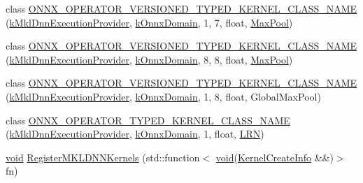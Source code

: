 \begin{DoxyCompactItemize}
\item 
class \mbox{\hyperlink{namespaceonnxruntime_1_1mkl__dnn_a4182bb90f51f577a356ff8ab41650f40}{O\+N\+N\+X\+\_\+\+O\+P\+E\+R\+A\+T\+O\+R\+\_\+\+V\+E\+R\+S\+I\+O\+N\+E\+D\+\_\+\+T\+Y\+P\+E\+D\+\_\+\+K\+E\+R\+N\+E\+L\+\_\+\+C\+L\+A\+S\+S\+\_\+\+N\+A\+ME}} (\mbox{\hyperlink{namespaceonnxruntime_abd1901c951bcb5845eeeaff9dd75ce97}{k\+Mkl\+Dnn\+Execution\+Provider}}, \mbox{\hyperlink{namespaceonnxruntime_ac0e7c0c106a2c9e9594560a3ab289fa0}{k\+Onnx\+Domain}}, 1, 7, float, \mbox{\hyperlink{classonnxruntime_1_1MaxPool}{Max\+Pool}})
\item 
class \mbox{\hyperlink{namespaceonnxruntime_1_1mkl__dnn_a363080a8931f5851f20746639d789b09}{O\+N\+N\+X\+\_\+\+O\+P\+E\+R\+A\+T\+O\+R\+\_\+\+V\+E\+R\+S\+I\+O\+N\+E\+D\+\_\+\+T\+Y\+P\+E\+D\+\_\+\+K\+E\+R\+N\+E\+L\+\_\+\+C\+L\+A\+S\+S\+\_\+\+N\+A\+ME}} (\mbox{\hyperlink{namespaceonnxruntime_abd1901c951bcb5845eeeaff9dd75ce97}{k\+Mkl\+Dnn\+Execution\+Provider}}, \mbox{\hyperlink{namespaceonnxruntime_ac0e7c0c106a2c9e9594560a3ab289fa0}{k\+Onnx\+Domain}}, 8, 8, float, \mbox{\hyperlink{classonnxruntime_1_1MaxPool}{Max\+Pool}})
\item 
class \mbox{\hyperlink{namespaceonnxruntime_1_1mkl__dnn_a37bf6af7a39fe95a4be8a901ab29ffb6}{O\+N\+N\+X\+\_\+\+O\+P\+E\+R\+A\+T\+O\+R\+\_\+\+V\+E\+R\+S\+I\+O\+N\+E\+D\+\_\+\+T\+Y\+P\+E\+D\+\_\+\+K\+E\+R\+N\+E\+L\+\_\+\+C\+L\+A\+S\+S\+\_\+\+N\+A\+ME}} (\mbox{\hyperlink{namespaceonnxruntime_abd1901c951bcb5845eeeaff9dd75ce97}{k\+Mkl\+Dnn\+Execution\+Provider}}, \mbox{\hyperlink{namespaceonnxruntime_ac0e7c0c106a2c9e9594560a3ab289fa0}{k\+Onnx\+Domain}}, 1, 8, float, Global\+Max\+Pool)
\item 
class \mbox{\hyperlink{namespaceonnxruntime_1_1mkl__dnn_a9fb3ca84ed79591f4becc5b23f58c497}{O\+N\+N\+X\+\_\+\+O\+P\+E\+R\+A\+T\+O\+R\+\_\+\+T\+Y\+P\+E\+D\+\_\+\+K\+E\+R\+N\+E\+L\+\_\+\+C\+L\+A\+S\+S\+\_\+\+N\+A\+ME}} (\mbox{\hyperlink{namespaceonnxruntime_abd1901c951bcb5845eeeaff9dd75ce97}{k\+Mkl\+Dnn\+Execution\+Provider}}, \mbox{\hyperlink{namespaceonnxruntime_ac0e7c0c106a2c9e9594560a3ab289fa0}{k\+Onnx\+Domain}}, 1, float, \mbox{\hyperlink{classonnxruntime_1_1mkl__dnn_1_1LRN}{L\+RN}})
\item 
\mbox{\hyperlink{mlasi_8h_a88f941d423cb2a819b70a1358982b1a6}{void}} \mbox{\hyperlink{namespaceonnxruntime_1_1mkl__dnn_abaedf03d0cd31659c2cd4e6d96f0e596}{Register\+M\+K\+L\+D\+N\+N\+Kernels}} (std\+::function$<$ \mbox{\hyperlink{mlasi_8h_a88f941d423cb2a819b70a1358982b1a6}{void}}(\mbox{\hyperlink{structonnxruntime_1_1KernelCreateInfo}{Kernel\+Create\+Info}} \&\&)$>$ fn)

\end{DoxyCompactItemize}
